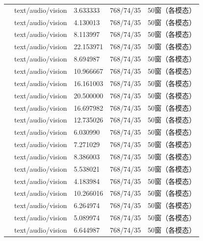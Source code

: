 \documentclass{gmcmthesis}
\begin{document}
\begin{longtable}{C{0.27\textwidth}C{0.16\textwidth}C{0.14\textwidth}C{0.14\textwidth}C{0.14\textwidth}}
\texttt{} & text/audio/vision & 3.633333 & 768/74/35 & 50窗（各模态） \\
\texttt{} & text/audio/vision & 4.130013 & 768/74/35 & 50窗（各模态） \\
\texttt{} & text/audio/vision & 8.113997 & 768/74/35 & 50窗（各模态） \\
\texttt{} & text/audio/vision & 22.153971 & 768/74/35 & 50窗（各模态） \\
\texttt{} & text/audio/vision & 8.694987 & 768/74/35 & 50窗（各模态） \\
\texttt{} & text/audio/vision & 10.966667 & 768/74/35 & 50窗（各模态） \\
\texttt{} & text/audio/vision & 16.161003 & 768/74/35 & 50窗（各模态） \\
\texttt{} & text/audio/vision & 20.500000 & 768/74/35 & 50窗（各模态） \\
\texttt{} & text/audio/vision & 16.697982 & 768/74/35 & 50窗（各模态） \\
\texttt{} & text/audio/vision & 12.735026 & 768/74/35 & 50窗（各模态） \\
\texttt{} & text/audio/vision & 6.030990 & 768/74/35 & 50窗（各模态） \\
\texttt{} & text/audio/vision & 7.271029 & 768/74/35 & 50窗（各模态） \\
\texttt{} & text/audio/vision & 8.386003 & 768/74/35 & 50窗（各模态） \\
\texttt{} & text/audio/vision & 5.538021 & 768/74/35 & 50窗（各模态） \\
\texttt{} & text/audio/vision & 4.183984 & 768/74/35 & 50窗（各模态） \\
\texttt{} & text/audio/vision & 10.266016 & 768/74/35 & 50窗（各模态） \\
\texttt{} & text/audio/vision & 6.264974 & 768/74/35 & 50窗（各模态） \\
\texttt{} & text/audio/vision & 5.089974 & 768/74/35 & 50窗（各模态） \\
\texttt{} & text/audio/vision & 6.644987 & 768/74/35 & 50窗（各模态） \\

\end{longtable}
\end{document}
